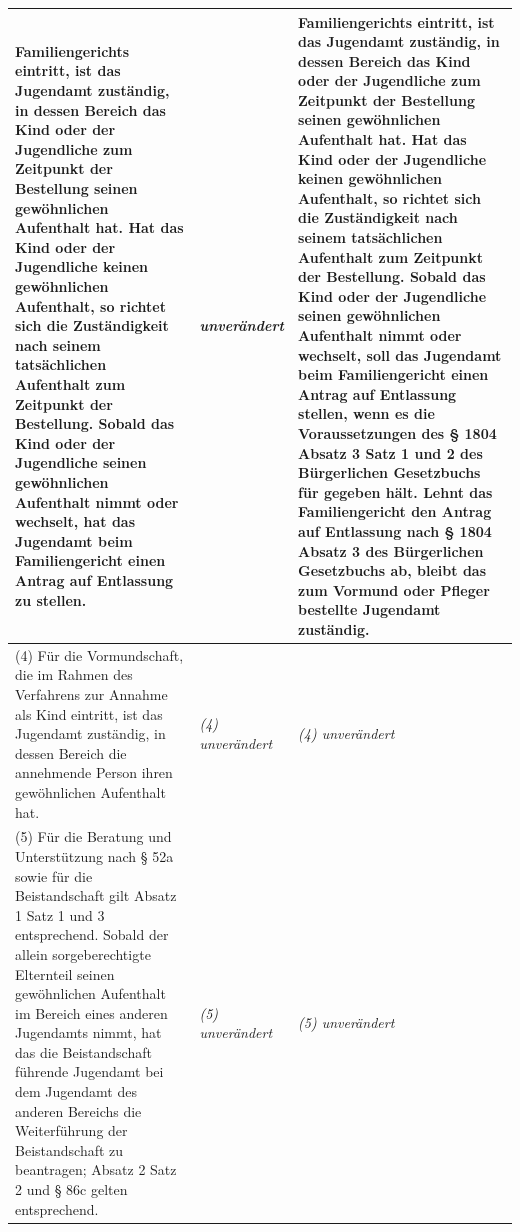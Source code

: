 \documentclass[10pt,a4paper,landscape]{article}
\begin{document}
\begin{longtable}{|L{8.6cm}|L{8.6cm}|L{8.6cm}|}
\hline
Familiengerichts eintritt, ist das Jugendamt zuständig, in dessen Bereich das Kind oder der Jugendliche zum Zeitpunkt der Bestellung seinen gewöhnlichen Aufenthalt hat. Hat das Kind oder der Jugendliche keinen gewöhnlichen Aufenthalt, so richtet sich die Zuständigkeit nach seinem tatsächlichen Aufenthalt zum Zeitpunkt der Bestellung. Sobald das Kind oder der Jugendliche seinen gewöhnlichen Aufenthalt nimmt oder wechselt, hat das Jugendamt beim Familiengericht einen Antrag auf Entlassung zu stellen. & \textit{unverändert} & Familiengerichts eintritt, ist das Jugendamt zuständig, in dessen Bereich das Kind oder der Jugendliche zum Zeitpunkt der Bestellung seinen gewöhnlichen Aufenthalt hat. Hat das Kind oder der Jugendliche keinen gewöhnlichen Aufenthalt, so richtet sich die Zuständigkeit nach seinem tatsächlichen Aufenthalt zum Zeitpunkt der Bestellung. \textbf{Sobald das Kind oder der Jugendliche seinen gewöhnlichen Aufenthalt nimmt oder wechselt, soll das Jugendamt beim Familiengericht einen Antrag auf Entlassung stellen, wenn es die Voraussetzungen des \S{} 1804 Absatz 3 Satz 1 und 2 des Bürgerlichen Gesetzbuchs für gegeben hält. Lehnt das Familiengericht den Antrag auf Entlassung nach \S{} 1804 Absatz 3 des Bürgerlichen Gesetzbuchs ab, bleibt das zum Vormund oder Pfleger bestellte Jugendamt zuständig. } \\
\hline
(4) Für die Vormundschaft, die im Rahmen des Verfahrens zur Annahme als Kind eintritt, ist das Jugendamt zuständig, in dessen Bereich die annehmende Person ihren gewöhnlichen Aufenthalt hat. & \textit{(4) unverändert} & \textit{(4) unverändert} \\
\hline
(5) Für die Beratung und Unterstützung nach \S{} 52a sowie für die Beistandschaft gilt Absatz 1 Satz 1 und 3 entsprechend. Sobald der allein sorgeberechtigte Elternteil seinen gewöhnlichen Aufenthalt im Bereich eines anderen Jugendamts nimmt, hat das die Beistandschaft führende Jugendamt bei dem Jugendamt des anderen Bereichs die Weiterführung der Beistandschaft zu beantragen; Absatz 2 Satz 2 und \S{} 86c gelten entsprechend. & \textit{(5) unverändert} & \textit{(5) unverändert} \\
\hline

\end{longtable}
\end{document}
